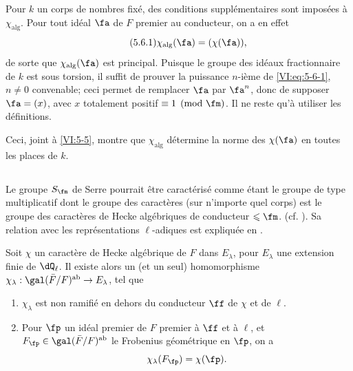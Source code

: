 Pour $k$ un corps de nombres fixé, des conditions supplémentaires sont 
imposées à $\chi_\text{alg}$. Pour tout idéal $\fa$ de $F$ premier au 
conducteur, on a en effet 
\begin{equation*}\tag{5.6.1}\label{VI:eq:5-6-1}
  \chi_\text{alg}(\fa) = (\chi(\fa)) \text{,} 
\end{equation*}
de sorte que $\chi_\text{alg}(\fa)$ est principal. Puisque le groupe des 
idéaux fractionnaire de $k$ est sous torsion, il suffit de prouver la 
puissance $n$-ième de \eqref{VI:eq:5-6-1}, $n\ne 0$ convenable; ceci permet 
de remplacer $\fa$ par $\fa^n$, donc de supposer $\fa=(x)$, avec $x$ totalement 
positif $\equiv 1\pmod\fm$. Il ne reste qu'à utiliser les définitions. 

Ceci, joint à \ref{VI:5-5}, montre que $\chi_\text{alg}$ détermine la norme 
des $\chi(\fa)$ en toutes les places de $k$. 





\subsection{}\label{VI:5-7}

Le groupe $S_\fm$ de Serre pourrait être caractérisé comme étant le 
groupe de type multiplicatif dont le groupe des caractères (sur n'importe 
quel corps) est le groupe des caractères de Hecke algébriques de conducteur 
$\leqslant \fm$. (cf. \cite[II 2.1 et 2.2]{se68}). Sa relation avec les 
représentations $\ell$-adiques est expliquée en \cite[II 2.3]{se68}. 





\begin{theorem_}[{\cite{se68}}]\label{VI:5-8}
Soit $\chi$ un caractère de Hecke algébrique de $F$ dans $E_\lambda$, pour 
$E_\lambda$ une extension finie de $\dQ_\ell$. Il existe alors un (et un seul) 
homomorphisme $\chi_\lambda:\gal(\bar F/F)^\textnormal{ab} \to E_\lambda$, tel 
que 
\begin{enumerate}[\indent (i)]
  \item $\chi_\lambda$ est non ramifié en dehors du conducteur $\ff$ de 
    $\chi$ et de $\ell$. 
  \item Pour $\fp$ un idéal premier de $F$ premier à $\ff$ et à $\ell$, 
    et $F_\fp\in \gal(\bar F/F)^\textnormal{ab}$ le Frobenius géométrique 
    en $\fp$, on a 
    \[
      \chi_\lambda(F_\fp) = \chi(\fp) \text{.}
    \] 
\end{enumerate}
\end{theorem_}





